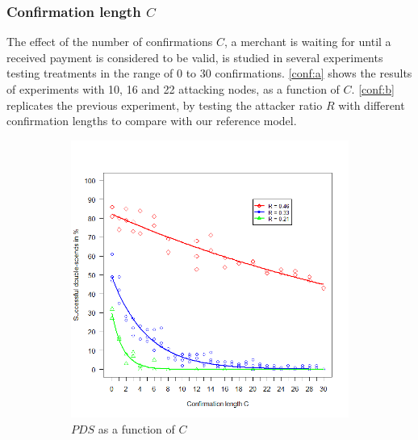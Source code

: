\documentclass[a4paper,12pt,twoside]{report}
\begin{document}
\subsubsection{Confirmation length $C$} \label{consres}
The effect of the number of confirmations $C$, a merchant is waiting for until a received payment is considered to be valid, is studied in several experiments testing treatments in the range of 0 to 30 confirmations. \autoref{conf:a} shows the results of experiments with 10, 16 and 22 attacking nodes, as a function of $C$. \autoref{conf:b} replicates the previous experiment, by testing the attacker ratio $R$ with different confirmation lengths to compare with our reference model.\begin{figure}[hb!]
\centering
\begin{subfigure}{.5\textwidth}
  \centering
  \includegraphics[width=\linewidth]{Experiments/Confirmations/conf.png}
  \caption{$PDS$ as a function of $C$}
  \label{conf:a}
\end{subfigure}%
\begin{subfigure}{.5\textwidth}
  \centering

\end{subfigure}
\end{figure}
\end{document}
